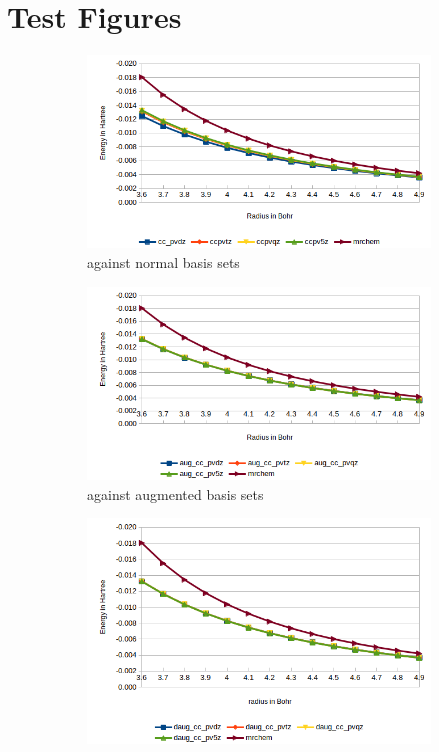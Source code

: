 \documentclass[../master_thesis.tex]{subfiles}
\begin{document}
\chapter{Test Figures}\label{Figures}
\begin{figure}[hb!]
  \centering
  \begin{subfigure}[b]{0.75\linewidth}
    \includegraphics[width=\linewidth]{img/Erwat.png}
    \caption{\mrchem against normal basis sets}
  \end{subfigure}
  \begin{subfigure}[b]{0.75\linewidth}
    \includegraphics[width=\linewidth]{img/Eraugwat.png}
    \caption{\mrchem against augmented basis sets}
  \end{subfigure}
  \begin{subfigure}[b]{0.75\linewidth}
    \includegraphics[width=\linewidth]{img/Erdaugwat.png}

\end{subfigure}
\end{figure}
\end{document}
